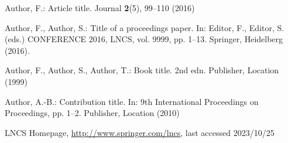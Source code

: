 \documentclass[runningheads]{llncs}
\begin{document}

%
%
%
% 
% 
%
\begin{thebibliography}{8}
Author, F.: Article title. Journal \textbf{2}(5), 99--110 (2016)

Author, F., Author, S.: Title of a proceedings paper. In: Editor,
F., Editor, S. (eds.) CONFERENCE 2016, LNCS, vol. 9999, pp. 1--13.
Springer, Heidelberg (2016). 

Author, F., Author, S., Author, T.: Book title. 2nd edn. Publisher,
Location (1999)

Author, A.-B.: Contribution title. In: 9th International Proceedings
on Proceedings, pp. 1--2. Publisher, Location (2010)

LNCS Homepage, \url{http://www.springer.com/lncs}, last accessed 2023/10/25
\end{thebibliography}
\end{document}
